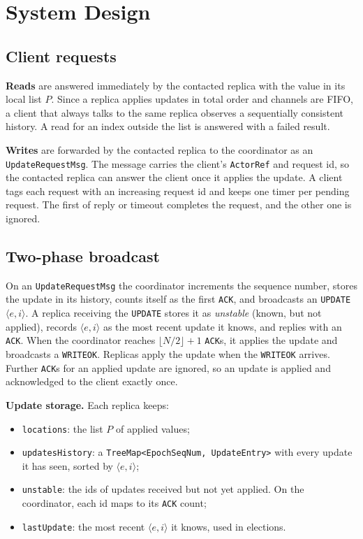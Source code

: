 \section{System Design}

\subsection{Client requests}

\textbf{Reads} are answered immediately by the contacted replica with the value in its local list $P$. Since a replica applies updates in total order and channels are FIFO, a client that always talks to the same replica observes a sequentially consistent history. A read for an index outside the list is answered with a failed result.

\textbf{Writes} are forwarded by the contacted replica to the coordinator as an \texttt{UpdateRequestMsg}. The message carries the client's \texttt{ActorRef} and request id, so the contacted replica can answer the client once it applies the update. A client tags each request with an increasing request id and keeps one timer per pending request. The first of reply or timeout completes the request, and the other one is ignored.

\subsection{Two-phase broadcast}

On an \texttt{UpdateRequestMsg} the coordinator increments the sequence number, stores the update in its history, counts itself as the first \texttt{ACK}, and broadcasts an \texttt{UPDATE} $\langle e,i\rangle$. A replica receiving the \texttt{UPDATE} stores it as \emph{unstable} (known, but not applied), records $\langle e,i\rangle$ as the most recent update it knows, and replies with an \texttt{ACK}. When the coordinator reaches $\lfloor N/2\rfloor + 1$ \texttt{ACK}s, it applies the update and broadcasts a \texttt{WRITEOK}. Replicas apply the update when the \texttt{WRITEOK} arrives. Further \texttt{ACK}s for an applied update are ignored, so an update is applied and acknowledged to the client exactly once.

\textbf{Update storage.} Each replica keeps:

\begin{itemize}[nosep]
    \item \texttt{locations}: the list $P$ of applied values;
    \item \texttt{updatesHistory}: a \texttt{TreeMap<EpochSeqNum, UpdateEntry>} with every update it has seen, sorted by $\langle e,i\rangle$;
    \item \texttt{unstable}: the ids of updates received but not yet applied. On the coordinator, each id maps to its \texttt{ACK} count;
    \item \texttt{lastUpdate}: the most recent $\langle e,i\rangle$ it knows, used in elections.
\end{itemize}

